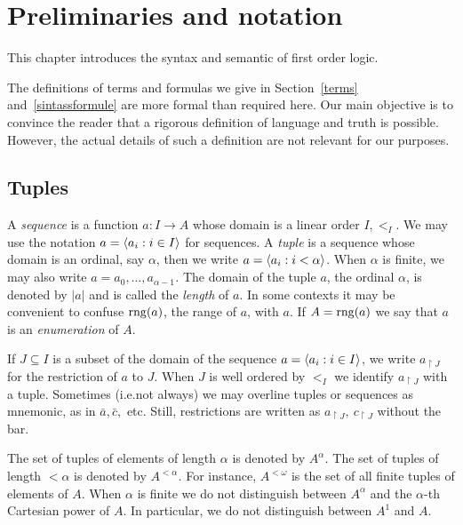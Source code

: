 \chapter{Preliminaries and notation}\label{termini}
This chapter introduces the syntax and semantic of first order logic.

The definitions of terms and formulas we give in Section~\ref{terms} and~\ref{sintassformule} are more formal than required here.
Our main objective is to convince the reader that a rigorous definition of language and truth is possible.
However, the actual details of such a definition are not relevant for our purposes.



\section{Tuples}

A \emph{sequence\/} is a function  $a:I\to A$ whose domain is a linear order $I,<_I$.
We may use the notation \emph{$a=\langle a_i: i\in I\rangle$} for sequences.
A \emph{tuple\/} is a sequence whose domain is an ordinal, say $\alpha$, then we write  $a=\langle a_i: i<\alpha\rangle$.
When $\alpha$ is finite, we may also write \emph{$a=a_0,\dots,a_{\alpha-1}$.}
The domain of the tuple $a$, the ordinal $\alpha$, is denoted by \emph{$|a|$\/} and is called the \emph{length\/} of $a$.
In some contexts it may be convenient to confuse $\mathop{\rm rng}(a)$, the range of $a$, with $a$.
If $A=\mathop{\rm rng}(a)$ we say that $a$ is an \emph{enumeration\/} of $A$.

If $J\subseteq I$ is a subset of the domain of the sequence $a=\langle a_i: i\in I\rangle$, we write  \emph{$a_{\restriction J}$} for the restriction of $a$ to $J$.
When $J$ is well ordered by $<_I$ we identify $a_{\restriction J}$ with a tuple.
\noindent\llap{\textcolor{red}{\Large\danger}\kern1.5ex}%
Sometimes (i.e.\@ not always) we may overline tuples or sequences as mnemonic, as in $\bar a,\bar c,$ etc.
Still, restrictions are written as $a_{\restriction J},\ c_{\restriction J}$ without the bar.

The set of tuples of elements of length $\alpha$ is denoted by \emph{$A^\alpha$.}
The set of tuples of length $<\alpha$ is denoted by \emph{$A^{<\alpha}$.}
For instance, \emph{$A^{<\omega}$\/} is the set of all finite tuples of elements of $A$.
When $\alpha$ is finite we do not distinguish between $A^\alpha$ and the $\alpha$-th Cartesian power of $A$.
In particular, we do not distinguish between $A^1$ and $A$.

